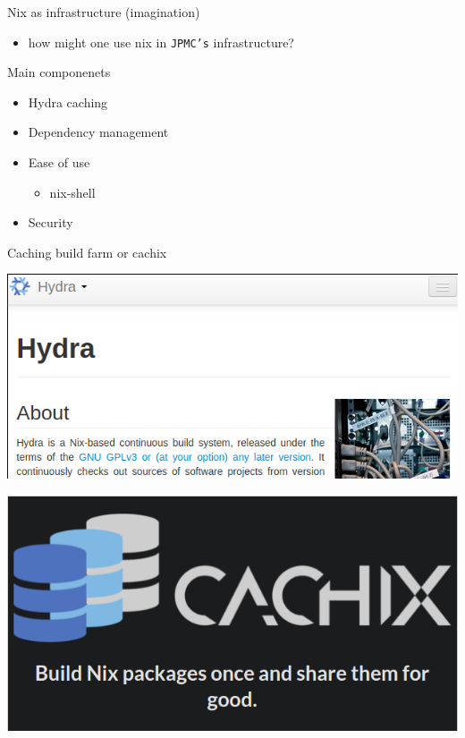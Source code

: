\documentclass[presentation]{beamer}
\begin{document}
\begin{frame}[label={sec:orgf2c370a},fragile]{Nix as infrastructure (imagination)}
 \begin{itemize}
\item how might one use nix in \texttt{JPMC's} infrastructure?
\end{itemize}
\begin{block}{Main componenets}
\begin{itemize}
\item Hydra caching
\item Dependency management
\item Ease of use
\begin{itemize}
\item nix-shell
\end{itemize}
\item Security
\end{itemize}
\end{block}
\begin{block}{Caching build farm or cachix}
\begin{center}
\includegraphics[width=.9\linewidth]{./images/screenshot-10.png}
\end{center}
\begin{center}
\includegraphics[width=.9\linewidth]{./images/screenshot-11.png}
\end{center}
\end{block}
\end{frame}
\end{document}
